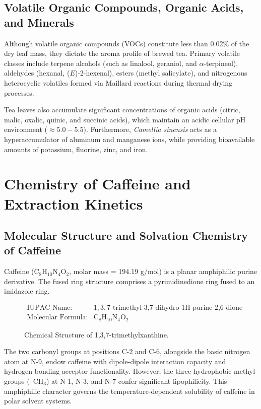 \documentclass[11pt,a4paper]{article}
\begin{document}
\subsection{Volatile Organic Compounds, Organic Acids, and Minerals}
Although volatile organic compounds (VOCs) constitute less than 0.02\% of the dry leaf mass, they dictate the aroma profile of brewed tea. Primary volatile classes include terpene alcohols (such as linalool, geraniol, and $\alpha$-terpineol), aldehydes (hexanal, ($E$)-2-hexenal), esters (methyl salicylate), and nitrogenous heterocyclic volatiles formed via Maillard reactions during thermal drying processes.

Tea leaves also accumulate significant concentrations of organic acids (citric, malic, oxalic, quinic, and succinic acids), which maintain an acidic cellular pH environment ($\approx 5.0 - 5.5$). Furthermore, \textit{Camellia sinensis} acts as a hyperaccumulator of aluminum and manganese ions, while providing bioavailable amounts of potassium, fluorine, zinc, and iron.

\section{Chemistry of Caffeine and Extraction Kinetics}

\subsection{Molecular Structure and Solvation Chemistry of Caffeine}
Caffeine ($\text{C}_8\text{H}_{10}\text{N}_4\text{O}_2$, molar mass = 194.19 g/mol) is a planar amphiphilic purine derivative. The fused ring structure comprises a pyrimidinedione ring fused to an imidazole ring. 

\begin{figure}[h!]
\centering
\begin{align*}
\text{IUPAC Name: } &1,3,7\text{-trimethyl-3,7-dihydro-1H-purine-2,6-dione} \\
\text{Molecular Formula: } &\text{C}_8\text{H}_{10}\text{N}_4\text{O}_2
\end{align*}
\caption{Chemical Structure of 1,3,7-trimethylxanthine.}
\end{figure}

The two carbonyl groups at positions C-2 and C-6, alongside the basic nitrogen atom at N-9, endow caffeine with dipole-dipole interaction capacity and hydrogen-bonding acceptor functionality. However, the three hydrophobic methyl groups ($\text{--CH}_3$) at N-1, N-3, and N-7 confer significant lipophilicity. This amphiphilic character governs the temperature-dependent solubility of caffeine in polar solvent systems.
\end{document}
